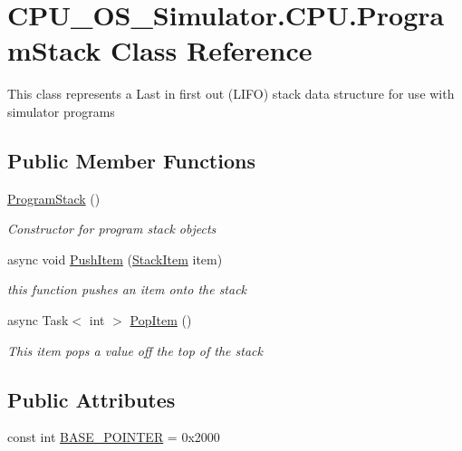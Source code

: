 \hypertarget{class_c_p_u___o_s___simulator_1_1_c_p_u_1_1_program_stack}{}\section{C\+P\+U\+\_\+\+O\+S\+\_\+\+Simulator.\+C\+P\+U.\+Program\+Stack Class Reference}
\label{class_c_p_u___o_s___simulator_1_1_c_p_u_1_1_program_stack}


This class represents a Last in first out (L\+I\+F\+O) stack data structure for use with simulator programs  


\subsection*{Public Member Functions}
\begin{DoxyCompactItemize}
\item 
\hyperlink{class_c_p_u___o_s___simulator_1_1_c_p_u_1_1_program_stack_a2a30dfbb7df3408de94c883c44aff090}{Program\+Stack} ()
\begin{DoxyCompactList}\small\item\em Constructor for program stack objects \end{DoxyCompactList}\item 
async void \hyperlink{class_c_p_u___o_s___simulator_1_1_c_p_u_1_1_program_stack_adc23c2c33829ad611ae71e507c99d362}{Push\+Item} (\hyperlink{class_c_p_u___o_s___simulator_1_1_c_p_u_1_1_stack_item}{Stack\+Item} item)
\begin{DoxyCompactList}\small\item\em this function pushes an item onto the stack \end{DoxyCompactList}\item 
async Task$<$ int $>$ \hyperlink{class_c_p_u___o_s___simulator_1_1_c_p_u_1_1_program_stack_ae960ef2aaad23ca328f91ebdf4c5e046}{Pop\+Item} ()
\begin{DoxyCompactList}\small\item\em This item pops a value off the top of the stack \end{DoxyCompactList}\end{DoxyCompactItemize}
\subsection*{Public Attributes}
\begin{DoxyCompactItemize}
\item 
const int \hyperlink{class_c_p_u___o_s___simulator_1_1_c_p_u_1_1_program_stack_a8fd75061f8ea538917fcc3b5718bc0d8}{B\+A\+S\+E\+\_\+\+P\+O\+I\+N\+T\+E\+R} = 0x2000
\end{DoxyCompactItemize}
